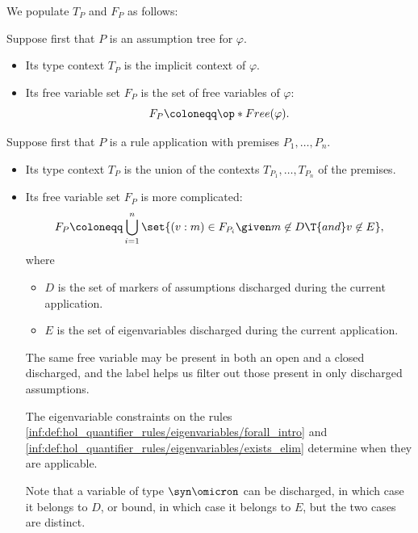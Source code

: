 \begin{definition}
  We populate \( T_P \) and \( F_P \) as follows:
  \begin{thmenum}[resume=def:hol_natural_deduction_proof_tree]
     Suppose first that \( P \) is an assumption tree for \( \varphi \).
    \begin{itemize}
      \item Its type context \( T_P \) is the implicit context of \( \varphi \).
      \item Its free variable set \( F_P \) is the set of free variables of \( \varphi \):
      \begin{equation}\label{eq:def:hol_natural_deduction_proof_tree/assumption/free_variables}
        F_P \coloneqq \op*{Free}(\varphi).
      \end{equation}
    \end{itemize}

     Suppose first that \( P \) is a rule application with premises \( P_1, \ldots, P_n \).
    \begin{itemize}
      \item Its type context \( T_P \) is the union of the contexts \( T_{P_1}, \ldots, T_{P_n} \) of the premises.
      \item Its free variable set \( F_P \) is more complicated:
      \begin{equation}\label{eq:def:hol_natural_deduction_proof_tree/application/free_variables}
        F_P \coloneqq \bigcup_{i=1}^n \set{ (v: m) \in F_{P_i} \given m \not\in D \T{and} v \not\in E },
      \end{equation}
      where
      \begin{itemize}
        \item \( D \) is the set of markers of assumptions discharged during the current application.
        \item \( E \) is the set of eigenvariables discharged during the current application.
      \end{itemize}

      The same free variable may be present in both an open and a closed discharged, and the label helps us filter out those present in only discharged assumptions.

      The eigenvariable constraints on the rules \ref{inf:def:hol_quantifier_rules/eigenvariables/forall_intro} and \ref{inf:def:hol_quantifier_rules/eigenvariables/exists_elim} determine when they are applicable.

      Note that a variable of type \( \syn\omicron \) can be discharged, in which case it belongs to \( D \), or bound, in which case it belongs to \( E \), but the two cases are distinct.
    \end{itemize}
  \end{thmenum}
\end{definition}
